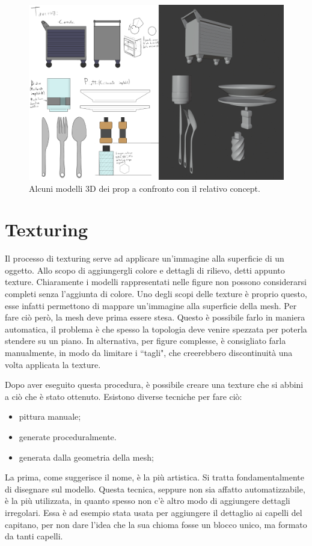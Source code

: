\begin{figure}
\centering
\includegraphics[width=.8\textwidth]{Figures/props}
\decoRule
\caption[Prop]{Alcuni modelli 3D dei prop a confronto con il relativo concept.}
\label{fig:prop}
\end{figure}

\newpage
\section{Texturing}

Il processo di texturing serve ad applicare un'immagine alla superficie di un oggetto. Allo scopo di aggiungergli colore e dettagli di rilievo, detti appunto texture.  
Chiaramente i modelli rappresentati nelle figure non possono considerarsi completi senza l'aggiunta di colore.
Uno degli scopi delle texture è proprio questo, esse infatti permettono di mappare un'immagine alla superficie della mesh.
Per fare ciò però, la mesh deve prima essere stesa. Questo è possibile farlo in maniera automatica, il problema è che spesso la topologia deve venire spezzata per poterla stendere su un piano.
In alternativa, per figure complesse, è consigliato farla manualmente, in modo da limitare i ``tagli", che creerebbero discontinuità una volta applicata la texture.

Dopo aver eseguito questa procedura, è possibile creare una texture che si abbini a ciò che è stato ottenuto. Esistono diverse tecniche per fare ciò:
\begin{itemize}
    \item pittura manuale;
    \item generate proceduralmente.
    \item generata dalla geometria della mesh;
\end{itemize}
La prima, come suggerisce il nome, è la più artistica.
Si tratta fondamentalmente di disegnare sul modello.
Questa tecnica, seppure non sia affatto automatizzabile, è la più utilizzata, in quanto spesso non c'è altro modo di aggiungere dettagli irregolari. Essa è ad esempio stata usata per aggiungere il dettaglio ai capelli del capitano, per non dare l'idea che la sua chioma fosse un blocco unico, ma formato da tanti capelli.

